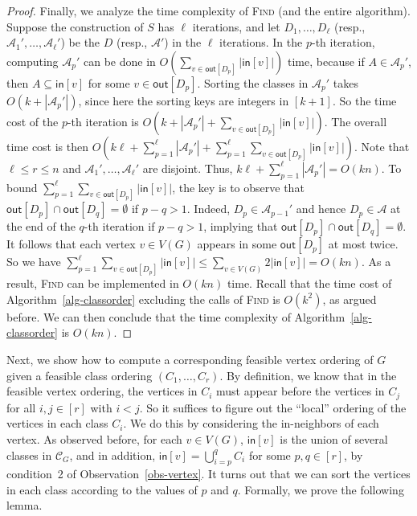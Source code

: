 \begin{proof}
Finally, we analyze the time complexity of \textsc{Find} (and the entire algorithm).
Suppose the construction of $S$ has $\ell$ iterations, and let $D_1,\dots,D_\ell$ (resp., $\mathcal{A}_1',\dots,\mathcal{A}_\ell'$) be the $D$ (resp., $\mathcal{A}'$) in the $\ell$ iterations.
In the $p$-th iteration, computing $\mathcal{A}_p'$ can be done in $O(\sum_{v \in \mathsf{out}[D_p]} |\mathsf{in}[v]|)$ time, because if $A \in \mathcal{A}_p'$, then $A \subseteq \mathsf{in}[v]$ for some $v \in \mathsf{out}[D_p]$.
Sorting the classes in $\mathcal{A}_p'$ takes $O(k+|\mathcal{A}_p'|)$, since here the sorting keys are integers in $[k+1]$.
So the time cost of the $p$-th iteration is $O(k+|\mathcal{A}_p'|+\sum_{v \in \mathsf{out}[D_p]} |\mathsf{in}[v]|)$.
The overall time cost is then $O(k \ell + \sum_{p=1}^\ell |\mathcal{A}_p'| + \sum_{p=1}^\ell \sum_{v \in \mathsf{out}[D_p]} |\mathsf{in}[v]|)$.
Note that $\ell \leq r \leq n$ and $\mathcal{A}_1',\dots,\mathcal{A}_\ell'$ are disjoint.
Thus, $k \ell + \sum_{p=1}^\ell |\mathcal{A}_p'| = O(kn)$.
To bound $\sum_{p=1}^\ell \sum_{v \in \mathsf{out}[D_p]} |\mathsf{in}[v]|$, the key is to observe that $\mathsf{out}[D_p] \cap \mathsf{out}[D_q] = \emptyset$ if $p-q>1$.
Indeed, $D_p \in \mathcal{A}_{p-1}'$ and hence $D_p \in \mathcal{A}$ at the end of the $q$-th iteration if $p-q>1$, implying that $\mathsf{out}[D_p] \cap \mathsf{out}[D_q] = \emptyset$.
It follows that each vertex $v \in V(G)$ appears in some $\mathsf{out}[D_p]$ at most twice.
So we have $\sum_{p=1}^\ell \sum_{v \in \mathsf{out}[D_p]} |\mathsf{in}[v]| \leq \sum_{v \in V(G)} 2|\mathsf{in}[v]| = O(kn)$.
As a result, \textsc{Find} can be implemented in $O(kn)$ time.
Recall that the time cost of Algorithm~\ref{alg-classorder} excluding the calls of \textsc{Find} is $O(k^2)$, as argued before.
We can then conclude that the time complexity of Algorithm~\ref{alg-classorder} is $O(kn)$.
\end{proof}

Next, we show how to compute a corresponding feasible vertex ordering of $G$ given a feasible class ordering $(C_1,\dots,C_r)$.
By definition, we know that in the feasible vertex ordering, the vertices in $C_i$ must appear before the vertices in $C_j$ for all $i,j \in [r]$ with $i < j$.
So it suffices to figure out the ``local'' ordering of the vertices in each class $C_i$.
We do this by considering the in-neighbors of each vertex.
As observed before, for each $v \in V(G)$, $\mathsf{in}[v]$ is the union of several classes in $\mathcal{C}_G$, and in addition, $\mathsf{in}[v] = \bigcup_{i=p}^q C_i$ for some $p,q \in [r]$, by condition~2 of Observation~\ref{obs-vertex}.
It turns out that we can sort the vertices in each class according to the values of $p$ and $q$.
Formally, we prove the following lemma.


